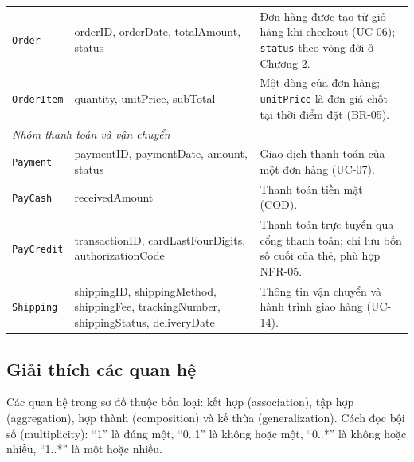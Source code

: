 \documentclass[12pt,a4paper,oneside]{report}
\begin{document}
\begin{longtable}{p{2.9cm}p{4.4cm}p{8.5cm}}
\texttt{Order} & orderID, orderDate, totalAmount, status & Đơn hàng được tạo từ giỏ hàng khi checkout (UC-06); \texttt{status} theo vòng đời ở Chương 2. \\
\texttt{OrderItem} & quantity, unitPrice, subTotal & Một dòng của đơn hàng; \texttt{unitPrice} là đơn giá chốt tại thời điểm đặt (BR-05). \\
\multicolumn{3}{l}{\textit{Nhóm thanh toán và vận chuyển}} \\
\texttt{Payment} & paymentID, paymentDate, amount, status & Giao dịch thanh toán của một đơn hàng (UC-07). \\
\texttt{PayCash} & receivedAmount & Thanh toán tiền mặt (COD). \\
\texttt{PayCredit} & transactionID, cardLastFourDigits, authorizationCode & Thanh toán trực tuyến qua cổng thanh toán; chỉ lưu bốn số cuối của thẻ, phù hợp NFR-05. \\
\texttt{Shipping} & shippingID, shippingMethod, shippingFee, trackingNumber, shippingStatus, deliveryDate & Thông tin vận chuyển và hành trình giao hàng (UC-14). \\
\end{longtable}

\subsection{Giải thích các quan hệ}

Các quan hệ trong sơ đồ thuộc bốn loại: kết hợp (association), tập hợp (aggregation), hợp thành (composition) và kế thừa (generalization). Cách đọc bội số (multiplicity): ``1'' là đúng một, ``0..1'' là không hoặc một, ``0..*'' là không hoặc nhiều, ``1..*'' là một hoặc nhiều.
\end{document}
